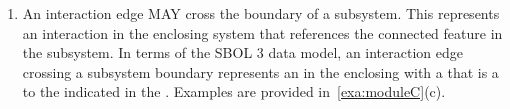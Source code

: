\begin{enumerate}
\item An interaction edge MAY cross the boundary of a subsystem. This represents an interaction in the enclosing system that references the connected feature in the subsystem.
	In terms of the SBOL 3 data model, an interaction edge crossing a subsystem boundary represents an  in the enclosing  with a  that is a  to the indicated  in the .
	Examples are provided in~\ref{exa:moduleC}(c).

	\begin{figure}[h!]
	\centering
	\\

\end{figure}
\end{enumerate}
